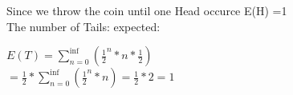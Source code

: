 Since we throw the coin until one Head occurce E(H) =1  \\

The number of Tails: expected:

$E(T) = \sum_{n=0}^{\inf} (\frac{1}{2}^{n}*n * \frac{1}{2}) $ \\
$ = \frac{1}{2} *\sum_{n=0}^{\inf} (\frac{1}{2}^{n}*n) = \frac{1}{2} * 2 = 1 $
